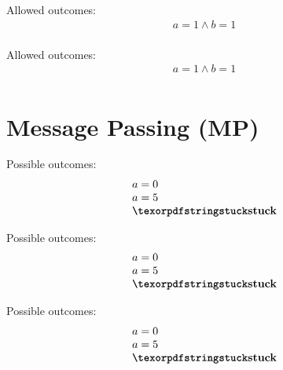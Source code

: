 \begin{minipage}[t]{0.2\linewidth}
Allowed outcomes:\\
\[\begin{array}{l}
a = 1 \land b = 1 \\
\end{array}\]
\end{minipage}
%
\lbJoinTemplate{\rlx}{\rel}{\rlx}{\rel}
\litmusTestEnd

\begin{minipage}[t]{0.2\linewidth}
Allowed outcomes:\\
\[\begin{array}{l}
a = 1 \land b = 1 \\
\end{array}\]
\end{minipage}
%
\lbJoinTemplate{\acq}{\rlx}{\acq}{\rlx}
\litmusTestEnd

\section{Message Passing (MP)}
\label{app:mp}

\begin{minipage}[t]{0.3\linewidth}
Possible outcomes:\\
\[\begin{array}{l}
a = 0 \\
a = 5 \\
\kw{stuck} \\
\end{array}\]
\end{minipage}
%
\mpTemplate{\rlx}{\na}{\na}{\rlx}{\rlx}{\na}
\litmusTestEnd

\begin{minipage}[t]{0.3\linewidth}
Possible outcomes:\\
\[\begin{array}{l}
a = 0 \\
a = 5 \\
\kw{stuck} \\
\end{array}\]
\end{minipage}
%
\mpTemplate{\rlx}{\na}{\na}{\rel}{\rlx}{\na}
\litmusTestEnd

\begin{minipage}[t]{0.3\linewidth}
Possible outcomes:\\
\[\begin{array}{l}
a = 0 \\
a = 5 \\
\kw{stuck} \\
\end{array}\]
\end{minipage}
%
\mpTemplate{\rlx}{\na}{\na}{\rlx}{\acq}{\na}
\litmusTestEnd

